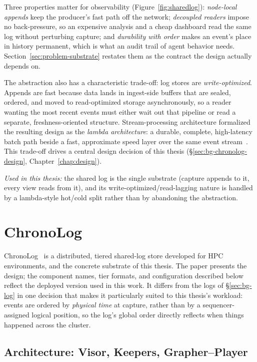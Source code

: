 Three properties matter for observability
(Figure~\ref{fig:sharedlog}): \emph{node-local appends} keep the producer's
fast path off the network; \emph{decoupled readers} impose no back-pressure,
so an expensive analysis and a cheap dashboard read the same log without
perturbing capture; and \emph{durability with order} makes an event's place
in history permanent, which is what an audit trail of agent behavior needs.
Section~\ref{sec:problem-substrate} restates them as the contract the design
actually depends on.

The abstraction also has a characteristic trade-off: log stores are
\emph{write-optimized}. Appends are fast because data lands in
ingest-side buffers that are sealed, ordered, and moved to
read-optimized storage asynchronously, so a reader wanting the most recent
events must either wait out that pipeline or read a separate,
freshness-oriented structure. Stream-processing architecture formalized the
resulting design as the \emph{lambda architecture}: a durable, complete,
high-latency batch path beside a fast, approximate speed layer over the same
event stream~\cite{marz2015big}. This trade-off drives a central design
decision of this thesis
(\S\ref{sec:bg-chronolog-design}, Chapter~\ref{chap:design}).

\emph{Used in this thesis:} the shared log is the single substrate
(capture appends to it, every view reads from it), and its
write-optimized/read-lagging nature is handled by a lambda-style hot/cold
split rather than by abandoning the abstraction.

\section{ChronoLog}
\label{sec:bg-chronolog}

ChronoLog~\cite{kougkas2020chronolog} is a distributed, tiered shared-log
store developed for HPC environments, and the concrete substrate of this
thesis. The paper presents the design; the component names, tier formats,
and configuration described below reflect the deployed version used in
this work. It differs from the logs of \S\ref{sec:bg-log} in one decision that
makes it particularly suited to this thesis's workload: events are ordered by
\emph{physical time} at capture, rather than by a sequencer-assigned logical
position, so the log's global order directly reflects when things happened
across the cluster.

\subsection{Architecture: Visor, Keepers, Grapher--Player}
\label{sec:bg-chronolog-arch}

